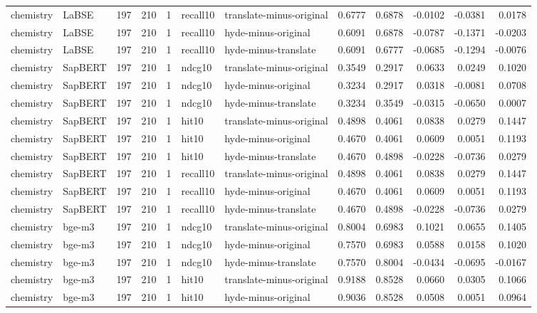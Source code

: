\begin{tabular}{llrrrllrrrrr}
chemistry & LaBSE & 197 & 210 & 1 & recall10 & translate-minus-original & 0.6777 & 0.6878 & -0.0102 & -0.0381 & 0.0178 \\
chemistry & LaBSE & 197 & 210 & 1 & recall10 & hyde-minus-original & 0.6091 & 0.6878 & -0.0787 & -0.1371 & -0.0203 \\
chemistry & LaBSE & 197 & 210 & 1 & recall10 & hyde-minus-translate & 0.6091 & 0.6777 & -0.0685 & -0.1294 & -0.0076 \\
chemistry & SapBERT & 197 & 210 & 1 & ndcg10 & translate-minus-original & 0.3549 & 0.2917 & 0.0633 & 0.0249 & 0.1020 \\
chemistry & SapBERT & 197 & 210 & 1 & ndcg10 & hyde-minus-original & 0.3234 & 0.2917 & 0.0318 & -0.0081 & 0.0708 \\
chemistry & SapBERT & 197 & 210 & 1 & ndcg10 & hyde-minus-translate & 0.3234 & 0.3549 & -0.0315 & -0.0650 & 0.0007 \\
chemistry & SapBERT & 197 & 210 & 1 & hit10 & translate-minus-original & 0.4898 & 0.4061 & 0.0838 & 0.0279 & 0.1447 \\
chemistry & SapBERT & 197 & 210 & 1 & hit10 & hyde-minus-original & 0.4670 & 0.4061 & 0.0609 & 0.0051 & 0.1193 \\
chemistry & SapBERT & 197 & 210 & 1 & hit10 & hyde-minus-translate & 0.4670 & 0.4898 & -0.0228 & -0.0736 & 0.0279 \\
chemistry & SapBERT & 197 & 210 & 1 & recall10 & translate-minus-original & 0.4898 & 0.4061 & 0.0838 & 0.0279 & 0.1447 \\
chemistry & SapBERT & 197 & 210 & 1 & recall10 & hyde-minus-original & 0.4670 & 0.4061 & 0.0609 & 0.0051 & 0.1193 \\
chemistry & SapBERT & 197 & 210 & 1 & recall10 & hyde-minus-translate & 0.4670 & 0.4898 & -0.0228 & -0.0736 & 0.0279 \\
chemistry & bge-m3 & 197 & 210 & 1 & ndcg10 & translate-minus-original & 0.8004 & 0.6983 & 0.1021 & 0.0655 & 0.1405 \\
chemistry & bge-m3 & 197 & 210 & 1 & ndcg10 & hyde-minus-original & 0.7570 & 0.6983 & 0.0588 & 0.0158 & 0.1020 \\
chemistry & bge-m3 & 197 & 210 & 1 & ndcg10 & hyde-minus-translate & 0.7570 & 0.8004 & -0.0434 & -0.0695 & -0.0167 \\
chemistry & bge-m3 & 197 & 210 & 1 & hit10 & translate-minus-original & 0.9188 & 0.8528 & 0.0660 & 0.0305 & 0.1066 \\
chemistry & bge-m3 & 197 & 210 & 1 & hit10 & hyde-minus-original & 0.9036 & 0.8528 & 0.0508 & 0.0051 & 0.0964 \\

\end{tabular}
